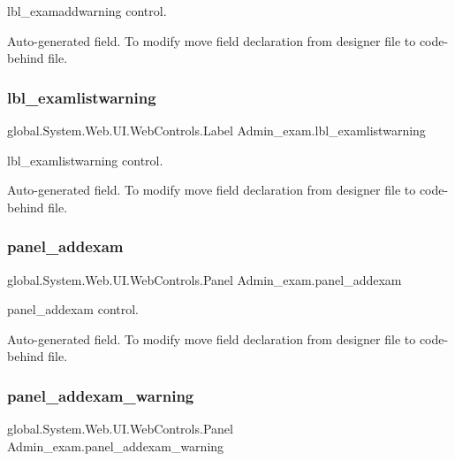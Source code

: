 lbl\+\_\+examaddwarning control. 

Auto-\/generated field. To modify move field declaration from designer file to code-\/behind file. \mbox{\label{class_admin__exam_af4a42ee8bbc70b7538a3c053df9896d6}} 
\subsubsection{\texorpdfstring{lbl\_examlistwarning}{lbl\_examlistwarning}}
{\footnotesize\ttfamily global.\+System.\+Web.\+U\+I.\+Web\+Controls.\+Label Admin\+\_\+exam.\+lbl\+\_\+examlistwarning\hspace{0.3cm}{\ttfamily [protected]}}



lbl\+\_\+examlistwarning control. 

Auto-\/generated field. To modify move field declaration from designer file to code-\/behind file. \mbox{\label{class_admin__exam_a4c768832676de770420b68f8a3bd0764}} 
\subsubsection{\texorpdfstring{panel\_addexam}{panel\_addexam}}
{\footnotesize\ttfamily global.\+System.\+Web.\+U\+I.\+Web\+Controls.\+Panel Admin\+\_\+exam.\+panel\+\_\+addexam\hspace{0.3cm}{\ttfamily [protected]}}



panel\+\_\+addexam control. 

Auto-\/generated field. To modify move field declaration from designer file to code-\/behind file. \mbox{\label{class_admin__exam_a4e8c7c73ae6ae42e875b41b1ec65a3df}} 
\subsubsection{\texorpdfstring{panel\_addexam\_warning}{panel\_addexam\_warning}}
{\footnotesize\ttfamily global.\+System.\+Web.\+U\+I.\+Web\+Controls.\+Panel Admin\+\_\+exam.\+panel\+\_\+addexam\+\_\+warning\hspace{0.3cm}{\ttfamily [protected]}}



